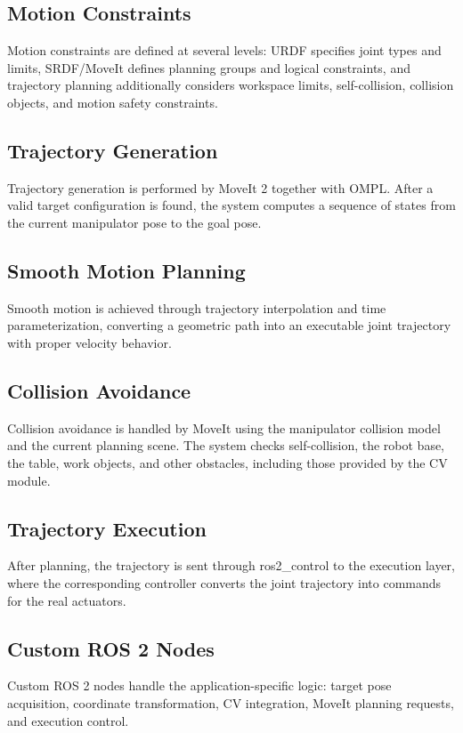 \subsection*{Motion Constraints}
Motion constraints are defined at several levels: URDF specifies joint types and limits, SRDF/MoveIt defines planning groups and logical constraints, and trajectory planning additionally considers workspace limits, self-collision, collision objects, and motion safety constraints.

\subsection*{Trajectory Generation}
Trajectory generation is performed by MoveIt 2 together with OMPL. After a valid target configuration is found, the system computes a sequence of states from the current manipulator pose to the goal pose.

\subsection*{Smooth Motion Planning}
Smooth motion is achieved through trajectory interpolation and time parameterization, converting a geometric path into an executable joint trajectory with proper velocity behavior.

\subsection*{Collision Avoidance}
Collision avoidance is handled by MoveIt using the manipulator collision model and the current planning scene. The system checks self-collision, the robot base, the table, work objects, and other obstacles, including those provided by the CV module.

\subsection*{Trajectory Execution}
After planning, the trajectory is sent through ros2\_control to the execution layer, where the corresponding controller converts the joint trajectory into commands for the real actuators.

\subsection*{Custom ROS 2 Nodes}
Custom ROS 2 nodes handle the application-specific logic: target pose acquisition, coordinate transformation, CV integration, MoveIt planning requests, and execution control.

